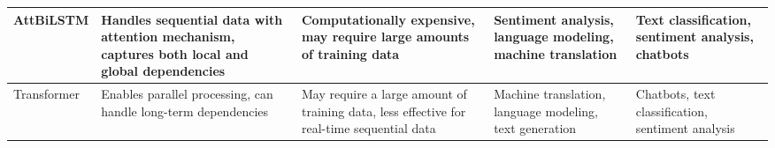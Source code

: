 \documentclass[a4paper]{article}
\begin{document}
\begin{table}[ht]
{\begin{tabular}{|p{1.5cm}|p{5cm}|p{5cm}|p{3cm}|p{3cm}|}
        AttBiLSTM & Handles sequential data with attention mechanism, \newline captures both local and global dependencies & Computationally expensive, \newline may require large amounts of training data & Sentiment analysis, \newline language modeling, \newline machine translation & Text classification, \newline sentiment analysis, \newline chatbots \\ \hline
        Transformer & Enables parallel processing, \newline can handle long-term dependencies & May require a large amount of training data, \newline less effective for real-time sequential data & Machine translation, \newline language modeling, \newline text generation & Chatbots, \newline text classification, \newline sentiment analysis \\ \hline
    \end{tabular}%
    }
\end{table}
\end{document}
